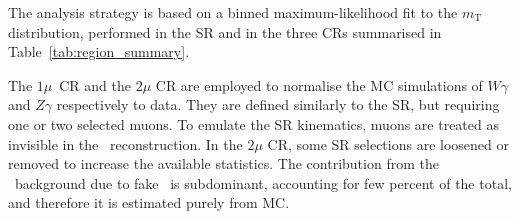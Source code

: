 The analysis strategy is based on a binned maximum-likelihood fit to the $m_{\mathrm{T}}$ distribution, performed in the SR and in the three CRs summarised in Table~\ref{tab:region_summary}. %

The $1\mu$~CR and the $2\mu$ CR are employed to normalise the MC simulations of $W\gamma$ and $Z\gamma$ respectively to data. They are defined similarly to the SR, but requiring one or two selected muons. To emulate the SR kinematics, muons are treated as invisible in the \ETmiss\ reconstruction. In the $2\mu$ CR, some SR selections are loosened or removed to increase the available statistics. The contribution from the  \yjetdirect\ background due to fake \ETmiss\ is subdominant, accounting for few percent of the total, and therefore it is estimated purely from MC.

